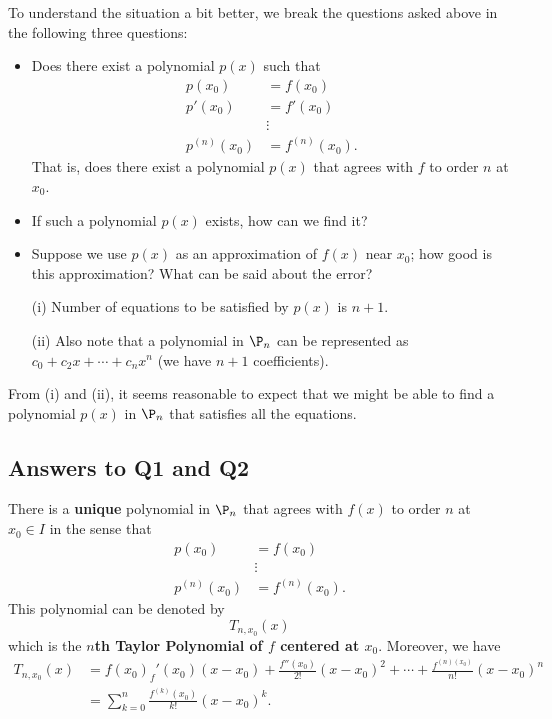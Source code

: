To understand the situation a bit better, we break the questions asked above in the following three questions:
\begin{itemize}
    \item Does there exist a polynomial \( p(x) \) such that 
        \begin{align*}
            p({x}_{0}) &= f({x}_{0}) \\
            p'({x}_{0}) &= f'({x}_{0}) \\
                        &\vdots \\
            p^{(n)}({x}_{0}) &= f^{(n)}({x}_{0}).
        \end{align*}
        That is, does there exist a polynomial \( p(x) \) that agrees with \( f  \) to order \( n  \) at \( {x}_{0} \).
    \item If such a polynomial \( p(x) \) exists, how can we find it? 
    \item Suppose we use \( p(x) \) as an approximation of \( f(x) \) near \( {x}_{0}  \); how good is this approximation? What can be said about the error?  
\end{itemize}

\begin{remark}
    \begin{enumerate}
        \item[(i)] Number of equations to be satisfied by \( p(x) \) is \( n + 1  \).
        \item[(ii)] Also note that a polynomial in \( {\P}_{n} \) can be represented as \( {c}_{0} + {c}_{2} x + \cdots + {c}_{n} x^{n} \) (we have \( n + 1  \) coefficients).  
    \end{enumerate}
    From (i) and (ii), it seems reasonable to expect that we might be able to find a polynomial \( p(x) \) in \( {\P}_{n} \) that satisfies all the equations. 
\end{remark}

\subsection{Answers to Q1 and Q2}

There is a \textbf{unique} polynomial in \( {\P}_{n} \) that agrees with \( f(x) \) to order \( n  \) at \( {x}_{0} \in I  \) in the sense that 
\begin{align*}
    p({x}_{0}) &= f({x}_{0} ) \\
               &\vdots \\
    p^{(n)}({x}_{0}) &= f^{(n)}({x}_{0}).
\end{align*}
This polynomial can be denoted by 
\[  {T}_{n, {x}_{0}}  (x)\]
which is the \textbf{\( n \)th Taylor Polynomial of \( f  \) centered at \( {x}_{0} \)}. Moreover, we have   
\begin{align*}
    {T}_{n,{x}_{0}}(x)  &= f({x}_{0}) _ f'({x}_{0}) (x - {x}_{0}) + \frac{ f''({x}_{0}) }{ 2!  } (x - {x}_{0})^{2} + \cdots + \frac{ f^{(n)({x}_{0}) } }{ n!  } (x - {x}_{0})^{n}   \\
                        &= \sum_{ k= 0  }^{ n } \frac{ f^{(k)}({x}_{0}) }{ k !  }  (x - {x}_{0})^{k}.
\end{align*}

